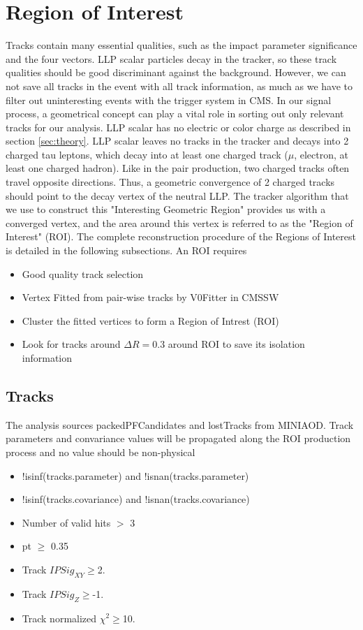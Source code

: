 \section{Region of Interest}\label{sec:ROIs}
Tracks contain many essential qualities, such as the impact parameter significance and the four vectors.
LLP scalar particles decay in the tracker, so these track qualities should be good discriminant against the background.
However, we can not save all tracks in the event with all track information, as much as we have to filter out uninteresting events with the trigger system in CMS.
In our signal process, a geometrical concept can play a vital role in sorting out only relevant tracks for our analysis.
LLP scalar has no electric or color charge as described in section \ref{sec:theory}.
LLP scalar leaves no tracks in the tracker and decays into 2 charged tau leptons, which decay into at least one charged track ($\mu$, electron, at least one charged hadron).
Like in the pair production, two charged tracks often travel opposite directions.
Thus, a geometric convergence of 2 charged tracks should point to the decay vertex of the neutral LLP.
The tracker algorithm that we use to construct this "Interesting Geometric Region" provides us with a converged vertex, and the area around this vertex is referred to as the "Region of Interest" (ROI).
The complete reconstruction procedure of the Regions of Interest is detailed in the following subsections.
An ROI requires
\begin{itemize}
  \item Good quality track selection
  \item Vertex Fitted from pair-wise tracks by V0Fitter in CMSSW
  \item Cluster the fitted vertices to form a Region of Intrest (ROI)
  \item Look for tracks around $\Delta R=0.3$ around ROI to save its isolation information
\end{itemize}

\subsection{Tracks}\label{sec:ROI_tracks}

The analysis sources packedPFCandidates and lostTracks from MINIAOD.
Track parameters and convariance values will be propagated along the ROI production process and no value should be non-physical
\begin{itemize}
  \item !isinf(tracks.parameter)  and !isnan(tracks.parameter) 
  \item !isinf(tracks.covariance) and !isnan(tracks.covariance) 
  \item Number of valid hits $>$ 3
  \item pt $\geq$ 0.35
  \item Track $IPSig_{XY}\geq$2.
  \item Track $IPSig_{Z}\geq$-1.
  \item Track normalized $\chi^{2}\geq$10.
\end{itemize}


